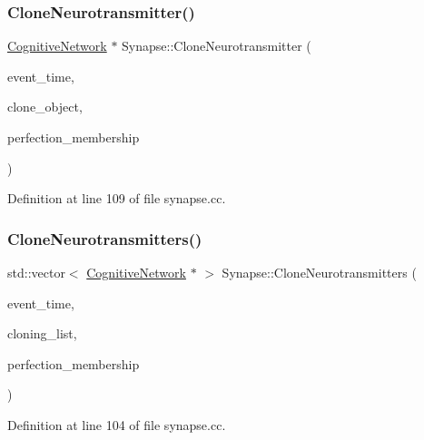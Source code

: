 \subsubsection{\texorpdfstring{Clone\+Neurotransmitter()}{CloneNeurotransmitter()}}
{\footnotesize\ttfamily \mbox{\hyperlink{class_cognitive_network}{Cognitive\+Network}} $\ast$ Synapse\+::\+Clone\+Neurotransmitter (\begin{DoxyParamCaption}\item[{std\+::chrono\+::time\+\_\+point$<$ \mbox{\hyperlink{universe_8h_a0ef8d951d1ca5ab3cfaf7ab4c7a6fd80}{Clock}} $>$}]{event\+\_\+time,  }\item[{\mbox{\hyperlink{class_cognitive_network}{Cognitive\+Network}} $\ast$}]{clone\+\_\+object,  }\item[{double}]{perfection\+\_\+membership }\end{DoxyParamCaption})}



Definition at line 109 of file synapse.\+cc.

\mbox{\label{class_synapse_a97c0db103754d337e28591f185c8379f}} 
\subsubsection{\texorpdfstring{Clone\+Neurotransmitters()}{CloneNeurotransmitters()}}
{\footnotesize\ttfamily std\+::vector$<$ \mbox{\hyperlink{class_cognitive_network}{Cognitive\+Network}} $\ast$ $>$ Synapse\+::\+Clone\+Neurotransmitters (\begin{DoxyParamCaption}\item[{std\+::chrono\+::time\+\_\+point$<$ \mbox{\hyperlink{universe_8h_a0ef8d951d1ca5ab3cfaf7ab4c7a6fd80}{Clock}} $>$}]{event\+\_\+time,  }\item[{std\+::vector$<$ \mbox{\hyperlink{class_cognitive_network}{Cognitive\+Network}} $\ast$$>$}]{cloning\+\_\+list,  }\item[{double}]{perfection\+\_\+membership }\end{DoxyParamCaption})}



Definition at line 104 of file synapse.\+cc.

\mbox{\label{class_synapse_aef4c17534bc93b31de8e81c1ad138b7b}} 
